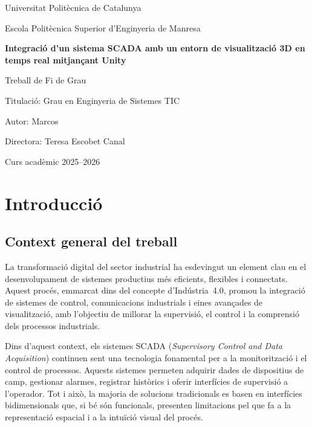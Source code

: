 \documentclass[12pt,a4paper]{report}
\begin{document}
\begin{titlepage}
    \centering
    {\Large Universitat Politècnica de Catalunya\par}
    \vspace{1cm}
    {\large Escola Politècnica Superior d'Enginyeria de Manresa  \par}
    \vspace{2.5cm}
    {\huge\bfseries Integració d'un sistema SCADA amb un entorn de visualització 3D en temps real mitjançant Unity\par}
    \vspace{2cm}
    {\Large Treball de Fi de Grau\par}
    \vspace{1.5cm}
    {\large Titulació: Grau en Enginyeria de Sistemes TIC\par}
    \vspace{1cm}
    {\large Autor: Marcos\par}
    \vspace{0.5cm}
    {\large Directora: Teresa Escobet Canal\par}
    \vfill
    {\large Curs acadèmic 2025--2026\par}
\end{titlepage}

\tableofcontents
\newpage

\chapter{Introducció}

\section{Context general del treball}

La transformació digital del sector industrial ha esdevingut un element clau en el desenvolupament de sistemes productius més eficients, flexibles i connectats. Aquest procés, emmarcat dins del concepte d'Indústria~4.0, promou la integració de sistemes de control, comunicacions industrials i eines avançades de visualització, amb l'objectiu de millorar la supervisió, el control i la comprensió dels processos industrials.

Dins d'aquest context, els sistemes SCADA (\textit{Supervisory Control and Data Acquisition}) continuen sent una tecnologia fonamental per a la monitorització i el control de processos. Aquests sistemes permeten adquirir dades de dispositius de camp, gestionar alarmes, registrar històrics i oferir interfícies de supervisió a l'operador. Tot i això, la majoria de solucions tradicionals es basen en interfícies bidimensionals que, si bé són funcionals, presenten limitacions pel que fa a la representació espacial i a la intuïció visual del procés.
\end{document}
